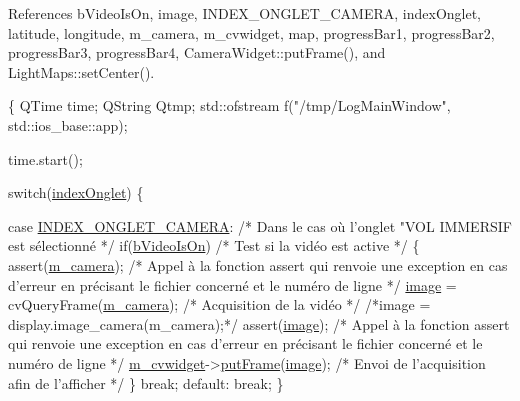 References b\-Video\-Is\-On, image, I\-N\-D\-E\-X\-\_\-\-O\-N\-G\-L\-E\-T\-\_\-\-C\-A\-M\-E\-R\-A, index\-Onglet, latitude, longitude, m\-\_\-camera, m\-\_\-cvwidget, map, progress\-Bar1, progress\-Bar2, progress\-Bar3, progress\-Bar4, Camera\-Widget\-::put\-Frame(), and Light\-Maps\-::set\-Center().


\begin{DoxyCode}
\{
    QTime time;
    QString Qtmp;
    std::ofstream    f(\textcolor{stringliteral}{"/tmp/LogMainWindow"}, std::ios\_base::app);

    time.start();

    \textcolor{keywordflow}{switch}(\hyperlink{classMainWindow_a2cf797221c17fdcce7888b123bd5847b}{indexOnglet})
    \{

        \textcolor{keywordflow}{case} \hyperlink{mainwindow_8h_ab9f3d4f131379475d4b36a15d2b59b5e}{INDEX\_ONGLET\_CAMERA}:                           
                                  \textcolor{comment}{/* Dans le cas où l'onglet "VOL IMMERSIF est
       sélectionné */}
            \textcolor{keywordflow}{if}(\hyperlink{classMainWindow_a8f36c27c20d39c3f0eafe091b9f2cf29}{bVideoIsOn})                                           
                         \textcolor{comment}{/* Test si la vidéo est active */}
            \{
                assert(\hyperlink{classMainWindow_a1e4ee7611df9ee764de50cd2bfdebc55}{m\_camera});                                      
                       \textcolor{comment}{/* Appel à la fonction assert qui renvoie une exception en cas
       d'erreur en précisant le fichier concerné et le numéro de ligne */}
                \hyperlink{classMainWindow_aeb45155a2035daf28097e853724529a1}{image} = cvQueryFrame(\hyperlink{classMainWindow_a1e4ee7611df9ee764de50cd2bfdebc55}{m\_camera});                   
                            \textcolor{comment}{/* Acquisition de la vidéo */}
                \textcolor{comment}{/*image = display.image\_camera(m\_camera);*/}
                assert(\hyperlink{classMainWindow_aeb45155a2035daf28097e853724529a1}{image});                                            
                    \textcolor{comment}{/* Appel à la fonction assert qui renvoie une exception en cas
       d'erreur en précisant le fichier concerné et le numéro de ligne */}
                \hyperlink{classMainWindow_a3225ace47a46792151d14646b6429712}{m\_cvwidget}->\hyperlink{classCameraWidget_a9ef3bc90490e18855ac24f29cc5cb20f}{putFrame}(\hyperlink{classMainWindow_aeb45155a2035daf28097e853724529a1}{image});            
                                      \textcolor{comment}{/* Envoi de l'acquisition afin de l'afficher */}
            \}
        \textcolor{keywordflow}{break};
    \textcolor{keywordflow}{default}:
        \textcolor{keywordflow}{break};
     \}


\end{DoxyCode}
